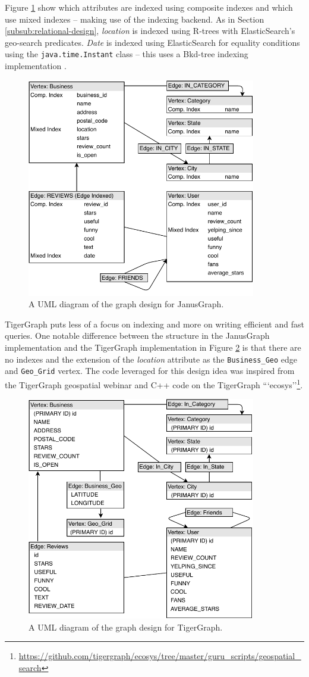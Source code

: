 Figure \ref{fig:janusgraph-design} show which attributes are indexed using composite indexes and which use mixed indexes -- making use of the indexing backend. As in Section \ref{subsub:relational-design}, \emph{location} is indexed using R-trees with ElasticSearch's geo-search predicates. \emph{Date} is indexed using ElasticSearch for equality conditions using the \texttt{java.time.Instant} class -- this uses a Bkd-tree indexing implementation \cite{es-bkdtree-index}.

\begin{figure}[h]
    \centering
    \includegraphics[width=10cm]{img/janus-design.pdf}
    \caption{A UML diagram of the graph design for JanusGraph.}
    \label{fig:janusgraph-design}
\end{figure}

TigerGraph puts less of a focus on indexing and more on writing efficient and fast queries. One notable difference between the structure in the JanusGraph implementation and the TigerGraph implementation in Figure \ref{fig:tigergraph-design} is that there are no indexes and the extension of the \emph{location} attribute as the \texttt{Business\_Geo} edge and \texttt{Geo\_Grid} vertex. The code leveraged for this design idea was inspired from the TigerGraph geospatial webinar \cite{graphgurus} and C++ code on the TigerGraph ```ecosys''\footnote{\url{https://github.com/tigergraph/ecosys/tree/master/guru\_scripts/geospatial\_search}}.

\begin{figure}[h]
    \centering
    \includegraphics[width=10cm]{img/tigergraph-design.pdf}
    \caption{A UML diagram of the graph design for TigerGraph.}
    \label{fig:tigergraph-design}
\end{figure}

